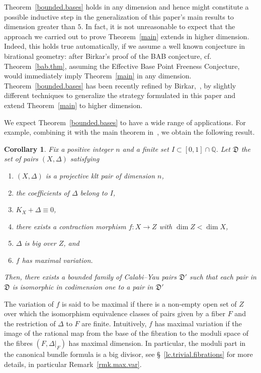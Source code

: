 \documentclass{amsart}[12pt,a4paper]
\newtheorem{corollary}[theorem]{Corollary}
\theoremstyle{definition}
\begin{document}
Theorem~\ref{bounded.bases} holds in any dimension and hence might constitute a possible inductive step in the generalization of this paper's main results to dimension greater than $5$.
In fact, it is not unreasonable to expect that the approach we carried out to prove Theorem~\ref{main} extends in higher dimension.
Indeed, this holds true automatically, if we assume a well known conjecture in birational geometry: after Birkar's proof of the BAB conjecture, cf. Theorem~\ref{bab.thm}, assuming the Effective Base Point Freeness Conjecture,~\cite[Conjecture~7.13.3]{PS} would immediately imply Theorem~\ref{main} in any dimension.
	Theorem~\ref{bounded.bases} has been recently refined by Birkar,~\cite{birkar.lcy.fibr}, by slightly different techniques to generalize the strategy formulated in this paper and extend Theorem~\ref{main} to higher dimension.

We expect Theorem~\ref{bounded.bases} to have a wide range of applications. 
For example, combining it with the main theorem in~\cite{HX14}, we obtain the following result.

\begin{corollary}
\label{max.var.cor}
	Fix a positive integer $n$ and a finite set $I\subset [0,1]\cap \mathbb{Q}$. 
	Let $\mathfrak{D}$ the set of pairs $(X, \Delta)$ satisfying
	\begin{enumerate}
	\item $(X, \Delta )$ is a projective  klt pair of dimension $n$,
		\item the coefficients of $\Delta$ belong to $I$,
		\item $K_X+\Delta \equiv 0$,
		\item there exists a contraction morphism $f\colon X\to Z$ with $\dim Z < \dim X$, 
		\item $\Delta$ is big over $Z$, and
		\item $f$ has maximal variation.
	\end{enumerate}
Then, there exists a bounded family of Calabi--Yau pairs $\mathfrak{D}'$ such that each pair in $\mathfrak{D}$ is isomorphic in codimension one to a pair in $\mathfrak{D}'$
\end{corollary}

The variation of $f$ is said to be maximal if there is a non-empty open set of $Z$ over which the isomorphism equivalence classes of pairs given by a fiber $F$ and the restriction of $\Delta$ to $F$ are finite.
Intuitively, $f$ has maximal variation if the image of the rational map from the base of the fibration to the moduli space of the fibres $(F,\Delta|_F)$ has maximal dimension. 
In particular, the moduli part in the canonical bundle formula is a big divisor, see \S~\ref{lc.trivial.fibrations} for more details, in particular Remark~\ref{rmk.max.var}.
\end{document}
